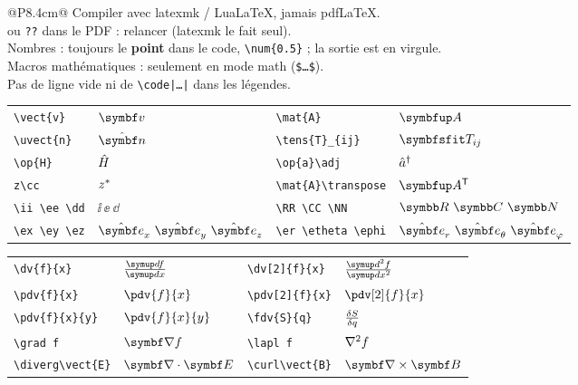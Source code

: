 \documentclass[a4paper,10pt]{scrartcl}
\makeatletter
\newcommand{\cheatsize}{\fontsize{8}{9.4}\selectfont}
\newcommand{\sect}[1]{\par\vspace{0.5em}{\sffamily\bfseries\small #1}\par\vspace{-0.2em}{\color{RuleColor}\rule{\linewidth}{0.4pt}}\par\vspace{0.1em}}
\newcommand{\cmd}{\cheatsize\verb}                 % code littéral : \cmd~\vect{v}~
\newcommand{\w}[1]{\texttt{\cheatsize #1}}         %
\newenvironment{tbl}[1]{\cheatsize\renewcommand{\arraystretch}{1.1}\begin{tabular}{@{}#1@{}}}{\end{tabular}\par}
\makeatother
\begin{document}
\begin{minipage}[t]{0.465\textwidth}
\sect{7. Pièges courants}
\begin{tbl}{P{8.4cm}}
Compiler avec latexmk / LuaLaTeX, jamais pdfLaTeX.\\
\w{[?]} ou \w{??} dans le PDF : relancer (latexmk le fait seul).\\
Nombres : toujours le \textbf{point} dans le code, \cmd~\num{0.5}~ ; la sortie est en virgule.\\
Macros mathématiques : seulement en mode math (\cmd~$…$~).\\
Pas de ligne vide ni de \cmd~\code|…|~ dans les légendes.\\
\end{tbl}
\end{minipage}\hfill
\begin{minipage}[t]{0.515\textwidth}
\cheatsize

\sect{8. Notations}
\begin{tbl}{l@{\enspace}l@{\qquad}l@{\enspace}l}
\cmd~\vect{v}~ & $\vect{v}$ & \cmd~\mat{A}~ & $\mat{A}$\\
\cmd~\uvect{n}~ & $\uvect{n}$ & \cmd~\tens{T}_{ij}~ & $\tens{T}_{ij}$\\
\cmd~\op{H}~ & $\hat{H}$ & \cmd~\op{a}\adj~ & $\hat{a}^{\dagger}$\\
\cmd~z\cc~ & $z^{*}$ & \cmd~\mat{A}\transpose~ & $\mat{A}\transpose$\\
\cmd~\ii \ee \dd~ & $\ii\ \ee\ \dd$ & \cmd~\RR \CC \NN~ & $\RR\ \CC\ \NN$\\
\cmd~\ex \ey \ez~ & $\ex\ \ey\ \ez$ & \cmd~\er \etheta \ephi~ & $\er\ \etheta\ \ephi$\\
\end{tbl}

\sect{9. Dérivées et opérateurs différentiels}
\begin{tbl}{l@{\enspace}l@{\qquad}l@{\enspace}l}
\cmd~\dv{f}{x}~ & $\dv{f}{x}$ & \cmd~\dv[2]{f}{x}~ & $\dv[2]{f}{x}$\\
\cmd~\pdv{f}{x}~ & $\pdv{f}{x}$ & \cmd~\pdv[2]{f}{x}~ & $\pdv[2]{f}{x}$\\
\cmd~\pdv{f}{x}{y}~ & $\pdv{f}{x}{y}$ & \cmd~\fdv{S}{q}~ & $\frac{\delta S}{\delta q}$\\
\cmd~\grad f~ & $\grad f$ & \cmd~\lapl f~ & $\nabla^{2} f$\\
\cmd~\diverg\vect{E}~ & $\diverg\vect{E}$ & \cmd~\curl\vect{B}~ & $\curl\vect{B}$\\
\end{tbl}


\end{minipage}
\end{document}
